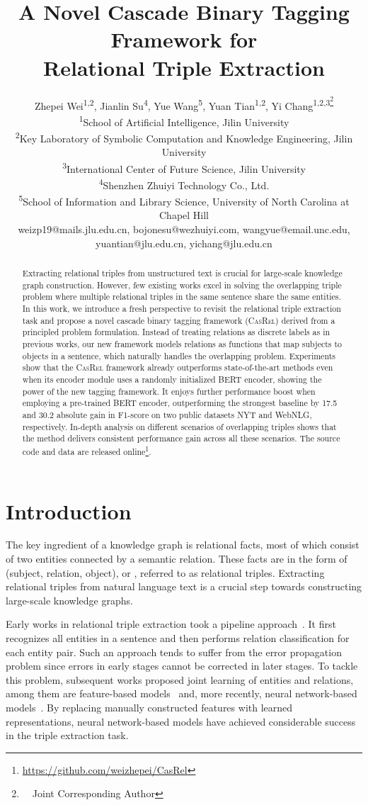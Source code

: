 \documentclass[11pt,a4paper]{article}
\title{A Novel Cascade Binary Tagging Framework for \\ Relational Triple Extraction}
\author{Zhepei Wei\textsuperscript{\rm 1,2}, Jianlin Su\textsuperscript{\rm 4}, Yue Wang\textsuperscript{\rm 5}, Yuan Tian\textsuperscript{\rm 1,2}, Yi Chang\textsuperscript{\rm 1,2,3\thanks{~~Joint Corresponding Author}
	}\\ 
	\textsuperscript{\rm 1}School of Artificial Intelligence, Jilin University\\
	\textsuperscript{\rm 2}Key Laboratory of Symbolic Computation and Knowledge Engineering, Jilin University\\
	\textsuperscript{\rm 3}International Center of Future Science, Jilin University\\
	\textsuperscript{\rm 4}Shenzhen Zhuiyi Technology Co., Ltd.\\ 
	\textsuperscript{\rm 5}School of Information and Library Science, University of North Carolina at Chapel Hill\\ 
	weizp19@mails.jlu.edu.cn,
	bojonesu@wezhuiyi.com,
	wangyue@email.unc.edu,\\
	yuantian@jlu.edu.cn,
	yichang@jlu.edu.cn\\
}
\date{}
\begin{document}
	
	\maketitle
	
	\begin{abstract}
Extracting relational triples from unstructured text is crucial for large-scale knowledge graph construction. However, few existing works excel in solving the overlapping triple problem where multiple relational triples in the same sentence share the same entities. In this work, we introduce a fresh perspective to revisit the relational triple extraction task and propose a novel cascade binary tagging framework (\textsc{CasRel}) derived from a principled problem formulation. Instead of treating relations as discrete labels as in previous works, our new framework models relations as functions that map subjects to objects in a sentence, which naturally handles the overlapping problem. Experiments show that the \textsc{CasRel} framework already outperforms state-of-the-art methods even when its encoder module uses a randomly initialized BERT encoder, showing the power of the new tagging framework. It enjoys further performance boost when employing a pre-trained BERT encoder, outperforming the strongest baseline by 17.5 and 30.2 absolute gain in F1-score on two public datasets NYT and WebNLG, respectively. In-depth analysis on different scenarios of overlapping triples shows that the method delivers consistent performance gain across all these scenarios. The source code and data are released online\footnote{\url{https://github.com/weizhepei/CasRel}}.
\end{abstract} 	
	\section{Introduction}
The key ingredient of a knowledge graph is relational facts, most of which consist of two entities connected by a semantic relation. These facts are in the form of ({subject, relation, object}), or , referred to as {relational triples}. Extracting relational triples from natural language text is a crucial step towards constructing large-scale knowledge graphs.

\par Early works in relational triple extraction took a pipeline approach~\citep{zelenko2003Kernel,zhou2005Exploring,chan2011Exploiting}. It first recognizes all entities in a sentence and then performs relation classification for each entity pair. Such an approach tends to suffer from the error propagation problem since errors in early stages cannot be corrected in later stages. To tackle this problem, subsequent works proposed joint learning of entities and relations, among them are feature-based models~\citep{yu2010Jointly,li2014Incremental,miwa2014Modeling,ren2017Cotype} and, more recently, neural network-based models~\citep{gupta2016Table,katiyar2017Going,zheng2017Joint,zeng2018Extracting,fu2019GraphRel}. By replacing manually constructed features with learned representations, neural network-based models have achieved considerable success in the triple extraction task.
\end{document}
